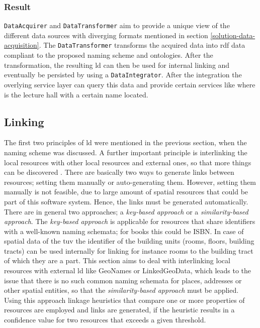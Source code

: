 \documentclass[draft,final]{vutinfth} %
\begin{document}
\subsubsection{Result}
\texttt{DataAcquirer} and \texttt{DataTransformer} aim to provide a unique view of the different data sources with diverging formats mentioned in section \ref{solution-data-acquisition}. The \texttt{DataTransformer} transforms the acquired data into \gls{rdf} data compliant to the proposed naming scheme and ontologies. After the transformation, the resulting \gls{ld} can then be used for internal linking and eventually be persisted by using a \texttt{DataIntegrator}. After the integration the overlying service layer can query this data and provide certain services like where is the lecture hall with a certain name located.

\subsection{Linking}
\label{solution-architectural-prototype:linking}
The first two principles of \gls{ld} were mentioned in the previous section, when the naming scheme was discussed. A further important principle is interlinking the local resources with other local resources and external ones, so that more things can be discovered \cite{berners-lee_linked_2009}. There are basically two ways to generate links between resources; setting them manually or auto-generating them. However, setting them manually is not feasible, due to large amount of spatial resources that could be part of this software system. Hence, the links must be generated automatically. There are in general two approaches; a \textit{key-based approach} or a \textit{similarity-based approach}\cite{heath_linked_2011}. The \textit{key-based approach} is applicable for resources that share identifiers with a well-known naming schemata; for books this could be ISBN. In case of spatial data of the \gls{tuv} the identifier of the building units (rooms, floors, building tracts) can be used internally for linking for instance rooms to the building tract of which they are a part. This section aims to deal with interlinking local resources with external \gls{ld} like GeoNames or LinkedGeoData, which leads to the issue that there is no such common naming schemata for places, addresses or other spatial entities, so that the \textit{similarity-based approach} must be applied. Using this approach linkage heuristics that compare one or more properties of resources are employed and links are generated, if the heuristic results in a confidence value for two resources that exceeds a given threshold.
\end{document}
